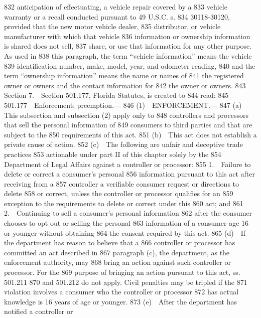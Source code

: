  832  anticipation of effectuating, a vehicle repair covered by a
  833  vehicle warranty or a recall conducted pursuant to 49 U.S.C. s.
  834  30118-30120, provided that the new motor vehicle dealer,
  835  distributor, or vehicle manufacturer with which that vehicle
  836  information or ownership information is shared does not sell,
  837  share, or use that information for any other purpose. As used in
  838  this paragraph, the term “vehicle information” means the vehicle
  839  identification number, make, model, year, and odometer reading,
  840  and the term “ownership information” means the name or names of
  841  the registered owner or owners and the contact information for
  842  the owner or owners.
  843         Section 7. Section 501.177, Florida Statutes, is created to
  844  read:
  845         501.177 Enforcement; preemption.—
  846         (1) ENFORCEMENT.—
  847         (a) This subsection and subsection (2) apply only to
  848  controllers and processors that sell the personal information of
  849  consumers to third parties and that are subject to the
  850  requirements of this act.
  851         (b) This act does not establish a private cause of action.
  852         (c) The following are unfair and deceptive trade practices
  853  actionable under part II of this chapter solely by the
  854  Department of Legal Affairs against a controller or processor:
  855         1. Failure to delete or correct a consumer’s personal
  856  information pursuant to this act after receiving from a
  857  controller a verifiable consumer request or directions to delete
  858  or correct, unless the controller or processor qualifies for an
  859  exception to the requirements to delete or correct under this
  860  act; and
  861         2. Continuing to sell a consumer’s personal information
  862  after the consumer chooses to opt out or selling the personal
  863  information of a consumer age 16 or younger without obtaining
  864  the consent required by this act.
  865         (d) If the department has reason to believe that a
  866  controller or processor has committed an act described in
  867  paragraph (c), the department, as the enforcement authority, may
  868  bring an action against such controller or processor. For the
  869  purpose of bringing an action pursuant to this act, ss. 501.211
  870  and 501.212 do not apply. Civil penalties may be tripled if the
  871  violation involves a consumer who the controller or processor
  872  has actual knowledge is 16 years of age or younger.
  873         (e) After the department has notified a controller or

